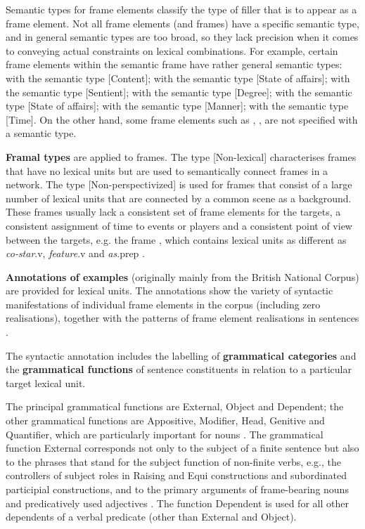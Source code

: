 \documentclass[output=paper,colorlinks,citecolor=brown]{langscibook}
\begin{document}
Semantic types for frame elements classify the type of filler that is to appear as a frame element. Not all frame elements (and frames) have a specific semantic type, and in general semantic types are too broad, so they lack precision when it comes to conveying actual constraints on lexical combinations. For example, certain frame elements within the semantic frame  have rather general semantic types:  with the semantic type [Content];  with the semantic type [State of affairs];  with the semantic type [Sentient];  with the semantic type [Degree];  with the semantic type [State of affairs];  with the semantic type [Manner];  with the semantic type [Time].
On the other hand, some frame elements such as , ,  are not specified with a semantic type.

\textbf{Framal types} are applied to frames. The type [Non-lexical] characterises fra\-mes that have no lexical units but are used to semantically connect frames in a network. The type [Non-perspectivized] is used for frames that consist of a large number of lexical units that are connected by a common scene as a background. These frames usually lack a consistent set of frame elements for the targets, a consistent assignment of time to events or players and a consistent point of view between the targets, e.g. the frame , which contains lexical units as different as \textit{co-star}.v, \textit{feature}.v and \textit{as}.prep \citep[87]{Ruppenhofer2016}.

\textbf{Annotations of examples} (originally mainly from the British National Corpus) are provided for lexical units. The annotations show the variety of syntactic manifestations of individual frame elements in the corpus (including zero realisations), together with the patterns of frame element realisations in sentences \citep[132]{fillmore2007valency}.

The syntactic annotation includes the labelling of \textbf{grammatical categories} and the \textbf{grammatical functions} of sentence constituents in relation to a particular target lexical unit.

The principal grammatical functions are External, Object and Dependent; the \newline  other grammatical functions are Appositive, Modifier, Head, Genitive and Quantifier, which are particularly important for nouns \citep[135]{fillmore2007valency}. The  grammatical function External corresponds not only to the subject of a finite sentence but also to the phrases that stand for the subject function of non-finite verbs, e.g., the controllers of subject roles in Raising and Equi constructions and subordinated participial constructions, and to the primary arguments of frame-bearing nouns and predicatively used adjectives \citep[135]{fillmore2007valency}. The function Dependent is used for all other dependents of a verbal predicate (other than External and Object).
\end{document}
